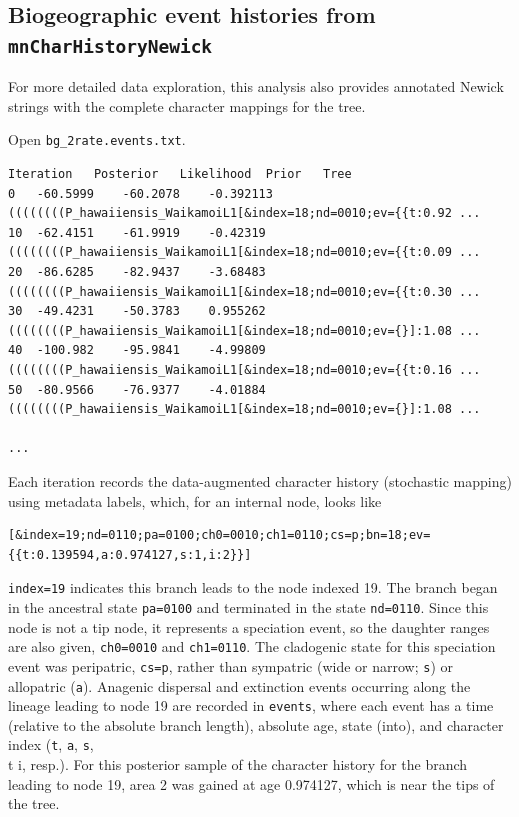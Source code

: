 \documentclass[11pt]{article}
\begin{document}
\subsection{Biogeographic event histories from {\tt mnCharHistoryNewick}}

For more detailed data exploration, this analysis also provides annotated Newick strings with the complete character mappings for the tree.

Open {\tt bg\_2rate.events.txt}.

\begin{framed}
\begin{lstlisting}[basicstyle=\tiny \listingsfont, columns=texcl]
Iteration	Posterior	Likelihood	Prior	Tree
0	-60.5999	-60.2078	-0.392113	((((((((P_hawaiiensis_WaikamoiL1[&index=18;nd=0010;ev={{t:0.92 ...
10	-62.4151	-61.9919	-0.42319	((((((((P_hawaiiensis_WaikamoiL1[&index=18;nd=0010;ev={{t:0.09 ...
20	-86.6285	-82.9437	-3.68483	((((((((P_hawaiiensis_WaikamoiL1[&index=18;nd=0010;ev={{t:0.30 ...
30	-49.4231	-50.3783	0.955262	((((((((P_hawaiiensis_WaikamoiL1[&index=18;nd=0010;ev={}]:1.08 ...
40	-100.982	-95.9841	-4.99809	((((((((P_hawaiiensis_WaikamoiL1[&index=18;nd=0010;ev={{t:0.16 ...
50	-80.9566	-76.9377	-4.01884	((((((((P_hawaiiensis_WaikamoiL1[&index=18;nd=0010;ev={}]:1.08 ...

...
\end{lstlisting}
\end{framed}

Each iteration records the data-augmented character history (stochastic mapping) using metadata labels, which, for an internal node, looks like

\begin{snugshade}
\begin{lstlisting}
[&index=19;nd=0110;pa=0100;ch0=0010;ch1=0110;cs=p;bn=18;ev={{t:0.139594,a:0.974127,s:1,i:2}}]
\end{lstlisting}
\end{snugshade}

{\tt index=19} indicates this branch leads to the node indexed 19.
The branch began in the ancestral state {\tt pa=0100} and terminated in the state {\tt nd=0110}.
Since this node is not a tip node, it represents a speciation event, so the daughter ranges are also given, {\tt ch0=0010} and {\tt ch1=0110}.
The cladogenic state for this speciation event was peripatric, {\tt cs=p}, rather than sympatric (wide or narrow; {\tt s}) or allopatric ({\tt a}).
Anagenic dispersal and extinction events occurring along the lineage leading to node 19 are recorded in {\tt events}, where each event has a time (relative to the absolute branch length), absolute age, state (into), and character index ({\tt t}, {\tt a}, {\tt s}, {\\t i}, resp.).
For this posterior sample of the character history for the branch leading to node 19, area 2 was gained at age 0.974127, which is near the tips of the tree.
\end{document}
